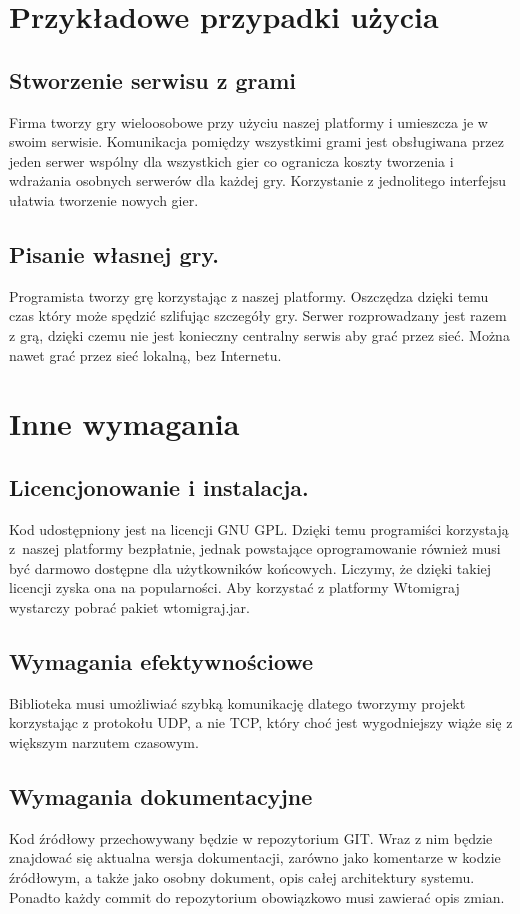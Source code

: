 \documentclass[a4paper, 12pt]{article}
\begin{document}
\section[Przykładowe przypadki użycia]{Przykładowe przypadki użycia}
\subsection{Stworzenie serwisu z grami} Firma tworzy gry wieloosobowe przy użyciu naszej platformy i umieszcza je w swoim serwisie. Komunikacja pomiędzy wszystkimi grami jest obsługiwana przez jeden serwer wspólny dla wszystkich gier co ogranicza koszty tworzenia i wdrażania osobnych serwerów dla każdej gry. Korzystanie z jednolitego interfejsu ułatwia tworzenie nowych gier.
\subsection{Pisanie własnej gry.} Programista tworzy grę korzystając z naszej platformy. Oszczędza dzięki temu czas który może spędzić szlifując szczegóły gry. Serwer rozprowadzany jest razem z grą, dzięki czemu nie jest konieczny centralny serwis aby grać przez sieć. Można nawet grać przez sieć lokalną, bez Internetu.

\section{Inne wymagania}
\subsection{Licencjonowanie i instalacja.}
Kod udostępniony jest na licencji GNU GPL. Dzięki temu programiści korzystają z~naszej platformy bezpłatnie, jednak powstające oprogramowanie również musi być darmowo dostępne dla użytkowników końcowych. Liczymy, że dzięki takiej licencji zyska ona na popularności. Aby korzystać z platformy Wtomigraj wystarczy pobrać pakiet wtomigraj.jar. 


\subsection{Wymagania efektywnościowe}
Biblioteka musi umożliwiać szybką komunikację dlatego tworzymy projekt korzystając z protokołu UDP, a nie TCP, który choć jest wygodniejszy wiąże się z większym narzutem czasowym.

\subsection[Wymagania dokumentacyjne]{Wymagania dokumentacyjne}
Kod źródłowy przechowywany będzie w repozytorium GIT. Wraz z nim będzie znajdować się aktualna wersja dokumentacji, zarówno jako komentarze w kodzie źródłowym, a także jako osobny dokument, opis całej architektury systemu. Ponadto każdy commit do repozytorium obowiązkowo musi zawierać opis zmian.
\end{document}
